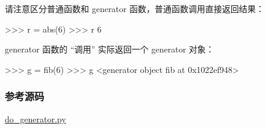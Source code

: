 请注意区分普通函数和 generator 函数，普通函数调用直接返回结果：

\begin{pythoncode}
>>> r = abs(6)
>>> r
6
\end{pythoncode}

generator 函数的 ``调用'' 实际返回一个 generator 对象：

\begin{pythoncode}
>>> g = fib(6)
>>> g
<generator object fib at 0x1022ef948>
\end{pythoncode}

\hypertarget{ux53c2ux8003ux6e90ux7801}{%
\subsubsection{参考源码}\label{ux53c2ux8003ux6e90ux7801}}

\href{https://github.com/michaelliao/learn-python3/blob/master/samples/advance/do_generator.py}{do\_generator.py}

